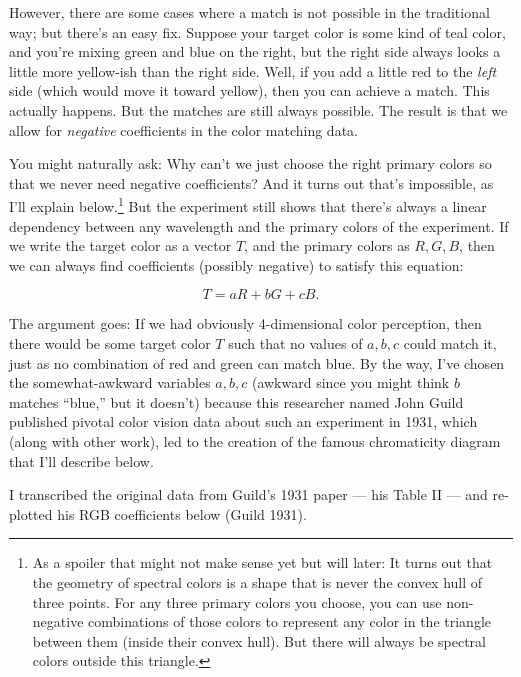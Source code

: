 \documentclass[
]{article}
\begin{document}
However, there are some cases where a match is not possible in the
traditional way; but there's an easy fix. Suppose your target color is
some kind of teal color, and you're mixing green and blue on the right,
but the right side always looks a little more yellow-ish than the right
side. Well, if you add a little red to the \emph{left} side (which would
move it toward yellow), then you can achieve a match. This actually
happens. But the matches are still always possible. The result is that
we allow for \emph{negative} coefficients in the color matching data.

You might naturally ask: Why can't we just choose the right primary
colors so that we never need negative coefficients? And it turns out
that's impossible, as I'll explain below.\footnote{As a spoiler that
  might not make sense yet but will later: It turns out that the
  geometry of spectral colors is a shape that is never the convex hull
  of three points. For any three primary colors you choose, you can use
  non-negative combinations of those colors to represent any color in
  the triangle between them (inside their convex hull). But there will
  always be spectral colors outside this triangle.} But the experiment
still shows that there's always a linear dependency between any
wavelength and the primary colors of the experiment. If we write the
target color as a vector \(T\), and the primary colors as \(R, G, B\),
then we can always find coefficients (possibly negative) to satisfy this
equation:

\[T = a R + b G + c B.\]

The argument goes: If we had obviously 4-dimensional color perception,
then there would be some target color \(T\) such that no values of
\(a,b,c\) could match it, just as no combination of red and green can
match blue. By the way, I've chosen the somewhat-awkward variables
\(a,b,c\) (awkward since you might think \(b\) matches ``blue,'' but it
doesn't) because this researcher named John Guild published pivotal
color vision data about such an experiment in 1931, which (along with
other work), led to the creation of the famous chromaticity diagram that
I'll describe below.

I transcribed the original data from Guild's 1931 paper --- his Table II
--- and re-plotted his RGB coefficients below (Guild 1931).
\end{document}
